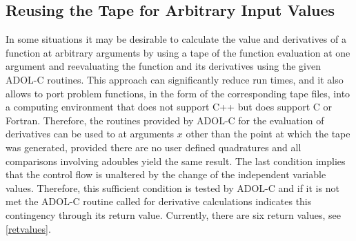 \documentclass[11pt,twoside]{article}
\begin{document}
\subsection{Reusing the Tape for Arbitrary Input Values}
\label{reuse_tape}
%
In some situations it may be desirable to calculate the value and
derivatives of a function at arbitrary arguments by using a tape of
the function evaluation at one argument and reevaluating the
function  and its derivatives using the given ADOL-C
routines. This approach can
significantly reduce run times, and it 
also allows to port problem functions, in the form of the  
corresponding tape files, into a computing environment that
does not support C++ but does support C or Fortran.  
Therefore, the routines provided by ADOL-C for the evaluation of derivatives
can be used to at arguments $x$ other than the
point at which the tape was generated, provided there are
no user defined quadratures and all comparisons involving
{\sf adouble}s yield the same result. The last condition 
implies that the control flow is unaltered by the change
of the independent variable values. Therefore, this sufficient
condition is tested by ADOL-C and if it is not met 
the ADOL-C routine called for derivative calculations indicates this
contingency through its return value. Currently, there are six return values,
see \autoref{retvalues}. 
\end{document}
